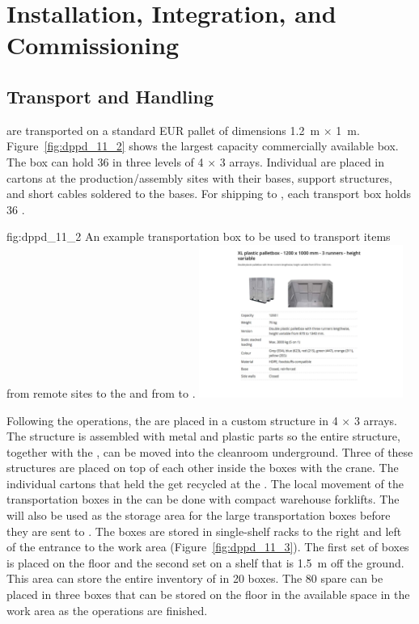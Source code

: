 \section{Installation, Integration, and Commissioning}
\label{sec:dp-pds-installation}

\subsection{Transport and Handling}

 are transported on a standard EUR pallet of dimensions \SI{1.2}{\m} $\times$ \SI{1}{\m}. Figure~\ref{fig:dppd_11_2} shows the largest capacity commercially available box. The box can hold \num{36}  in three levels of \num{4} $\times$ \num{3} arrays. Individual  are placed in cartons at the production/assembly sites with their bases, support structures, and short  cables soldered to the bases. For shipping to , each transport box holds \num{36} . 

\begin{dunefigure}{fig:dppd_11_2}
{An example transportation box to be used to transport items from remote sites to the  and from  to \surf.}
\includegraphics[width=0.5\textwidth]{graphics/dppd_11_2}
\end{dunefigure}

Following the  operations, the  are placed in a custom structure in \num{4} $\times$ \num{3} arrays. The structure is assembled with metal and plastic parts so the entire structure, together with the , can be moved into the cleanroom underground. Three of these structures are placed on top of each other inside the boxes with the crane. The individual cartons that held the  get recycled at the . The local movement of the transportation boxes in the  can be done with compact warehouse forklifts. The  will also be used as the storage area for the large  transportation boxes before they are sent to . The boxes are stored in single-shelf racks to the right and left of the entrance to the work area (Figure~\ref{fig:dppd_11_3}). The first set of boxes is placed on the floor and the second set on a shelf that is \SI{1.5}{\m} off the ground. This area can store the entire \dual {}  inventory of \dpnumpmtch {} in \num{20} boxes. The \num{80} spare  can be placed in three boxes that can be stored on the floor in the available space in the work area as the \dual {}  operations are finished.

